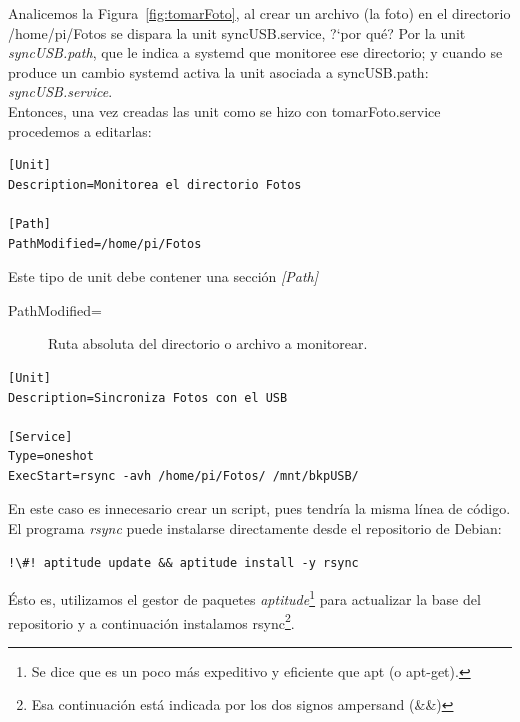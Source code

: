 \documentclass[10pt,a4paper]{article}
\newenvironment{unitFrame}[1][]{%
    \begin{mdframed}[%
        frametitle={#1},
        skipabove=\baselineskip plus 2pt minus 1pt,
        skipbelow=\baselineskip plus 2pt minus 1pt,
        linewidth=0.5pt,
        frametitlerule=true,
        frametitlebackgroundcolor=gray!10
    ]%
}{%
    \end{mdframed}
}
\begin{document}
Analicemos la Figura~\ref{fig:tomarFoto}, al crear un archivo (la foto) en el directorio /home/pi/Fotos se dispara la unit syncUSB.service, ?`por qu\'e? Por la unit \emph{syncUSB.path}, que le indica a systemd que monitoree ese directorio; y cuando se produce un cambio systemd activa la unit asociada a syncUSB.path: \emph{syncUSB.service}.\\

Entonces, una vez creadas las unit como se hizo con tomarFoto.service procedemos a editarlas:

\begin{scriptsize}
\begin{unitFrame}[/etc/systemd/system/syncUSB.path]
\begin{verbatim}
[Unit]
Description=Monitorea el directorio Fotos

[Path]
PathModified=/home/pi/Fotos
\end{verbatim}
\end{unitFrame}
\end{scriptsize}

Este tipo de unit debe contener una secci\'on \emph{[Path]}

\begin{description}
    \item [PathModified=] Ruta absoluta del directorio o archivo a monitorear.
\end{description}

\begin{scriptsize}
\begin{unitFrame}[/etc/systemd/system/syncUSB.service]
\begin{verbatim}
[Unit]
Description=Sincroniza Fotos con el USB

[Service]
Type=oneshot
ExecStart=rsync -avh /home/pi/Fotos/ /mnt/bkpUSB/
\end{verbatim}
\end{unitFrame}
\end{scriptsize}

En este caso es innecesario crear un script, pues tendr\'ia la misma l\'inea de c\'odigo. El programa \emph{rsync} puede instalarse directamente desde el repositorio de Debian:
\begin{lstlisting}
!\#! aptitude update && aptitude install -y rsync
\end{lstlisting}
\'Esto es, utilizamos el gestor de paquetes \emph{aptitude}\footnote{Se dice que es un poco m\'as expeditivo y eficiente que apt (o apt-get).} para actualizar la base del repositorio y a continuaci\'on instalamos rsync\footnote{Esa continuaci\'on est\'a indicada por los dos signos ampersand (\&\&)}.\\
\end{document}

